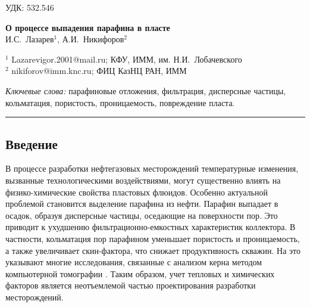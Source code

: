 \documentclass[a4paper,12pt]{article}
\begin{document}
\noindent
УДК: 532.546

{\large
\begin{center}
\textbf{О процессе выпадения парафина в пласте}\\
И.С.~Лазарев$^1$, А.И.~Никифоров$^2$
\end{center}
} 

{\footnotesize
\noindent $^1$ Lazarevigor.2001@mail.ru; КФУ, ИММ, им. Н.И.~Лобачевского \\
\noindent $^2$ nikiforov@imm.knc.ru; ФИЦ КазНЦ РАН, ИММ
}


\begin{abstract}
	В работе рассматривается задача двухфазной неизотермической фильтрации воды и нефти. Нефть моделируется как смесь двух несмешивающихся с водой углеводородных составляющих "нефти" и "парафина". Задача численно решается методом контрольных объемов. Для прогнозирования кристаллизации парафина применяется теория идеального раствора бинарной смеси. Основное внимание уделяется процессам осаждения частиц в пористой среде. Для уравнений, определяющих динамику изменения пористости и проницаемости, используются зависимости, основанные на функции распределения пор по размерам. 
\end{abstract}

\noindent
\textit{Ключевые слова:} парафиновые отложения, фильтрация, дисперсные частицы, кольматация, пористость, проницаемость, повреждение пласта.


\vspace{1em}
\hrule

\vspace{1em}
{\subsection*{\normalsize Введение}}
	В процессе разработки нефтегазовых месторождений температурные изменения, вызванные технологическими воздействиями, могут существенно влиять на физико-химические свойства пластовых флюидов. Особенно актуальной проблемой становится выделение парафина из нефти. Парафин выпадает в осадок, образуя дисперсные частицы, оседающие на поверхности пор. Это приводит к ухудшению фильтрационно-емкостных характеристик коллектора. В частности, кольматация пор парафином уменьшает пористость и проницаемость, а также увеличивает скин-фактора, что снижает продуктивность скважин. На это указывают многие исследования, связанные с анализом керна методом компьютерной томографии \cite{bib:01}. Таким образом, учет тепловых и химических факторов является неотъемлемой частью проектирования разработки месторождений.
\end{document}
